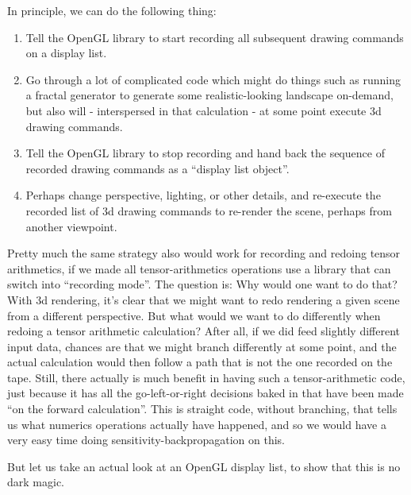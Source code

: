 \documentclass[11pt]{article}
\providecommand{\tightlist}{%
      \setlength{\itemsep}{0pt}\setlength{\parskip}{0pt}}
\begin{document}
In principle, we can do the following thing:

\begin{enumerate}
\def\labelenumi{\arabic{enumi}.}
\tightlist
\item
  Tell the OpenGL library to start recording all subsequent drawing
  commands on a display list.
\item
  Go through a lot of complicated code which might do things such as
  running a fractal generator to generate some realistic-looking
  landscape on-demand, but also will - interspersed in that calculation
  - at some point execute 3d drawing commands.
\item
  Tell the OpenGL library to stop recording and hand back the sequence
  of recorded drawing commands as a ``display list object''.
\item
  Perhaps change perspective, lighting, or other details, and re-execute
  the recorded list of 3d drawing commands to re-render the scene,
  perhaps from another viewpoint.
\end{enumerate}

Pretty much the same strategy also would work for recording and redoing
tensor arithmetics, if we made all tensor-arithmetics operations use a
library that can switch into ``recording mode''. The question is: Why
would one want to do that? With 3d rendering, it's clear that we might
want to redo rendering a given scene from a different perspective. But
what would we want to do differently when redoing a tensor arithmetic
calculation? After all, if we did feed slightly different input data,
chances are that we might branch differently at some point, and the
actual calculation would then follow a path that is not the one recorded
on the tape. Still, there actually is much benefit in having such a
tensor-arithmetic code, just because it has all the go-left-or-right
decisions baked in that have been made ``on the forward calculation''.
This is straight code, without branching, that tells us what numerics
operations actually have happened, and so we would have a very easy time
doing sensitivity-backpropagation on this.

But let us take an actual look at an OpenGL display list, to show that
this is no dark magic.
\end{document}
